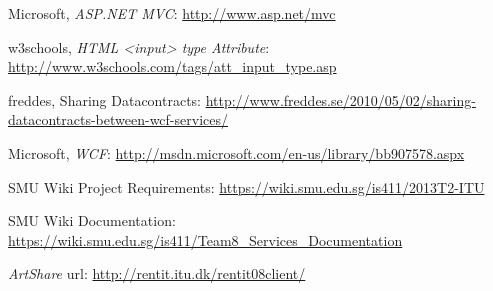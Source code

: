 \documentclass[../report.tex]{subfiles}
\begin{document}
\graphicspath{{img/}{../img/}}
\begingroup
\renewcommand{\chapter}[2]{}%
\begin{thebibliography}{}

Microsoft, \textit{ASP.NET MVC}: \url{http://www.asp.net/mvc} 

w3schools, \textit{HTML <input> type Attribute}: \url{http://www.w3schools.com/tags/att\_input\_type.asp} 

freddes, Sharing Datacontracts: \url{http://www.freddes.se/2010/05/02/sharing-datacontracts-between-wcf-services/}

Microsoft, \textit{WCF}: \url{http://msdn.microsoft.com/en-us/library/bb907578.aspx}

SMU Wiki Project Requirements: \url{https://wiki.smu.edu.sg/is411/2013T2-ITU}

SMU Wiki Documentation: \url{https://wiki.smu.edu.sg/is411/Team8\_Services\_Documentation}

\textit{ArtShare} url: \url{http://rentit.itu.dk/rentit08client/}

\end{thebibliography}
\endgroup
\end{document}
